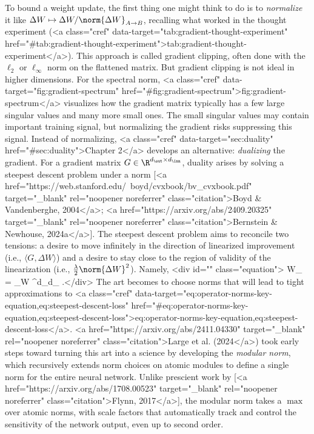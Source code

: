 To bound a weight update, the first thing one might think to do is to \textit{normalize} it like $\Delta W \mapsto \Delta W / \norm{\Delta W}_{A \to B}$, recalling what worked in the thought experiment (<a class="cref" data-target="tab:gradient-thought-experiment" href="#tab:gradient-thought-experiment">tab:gradient-thought-experiment</a>). This approach is called gradient clipping, often done with the $\ell_2$ or $\ell_\infty$ norm on the flattened matrix. But gradient clipping is not ideal in higher dimensions. For the spectral norm, <a class="cref" data-target="fig:gradient-spectrum" href="#fig:gradient-spectrum">fig:gradient-spectrum</a> visualizes how the gradient matrix typically has a few large singular values and many more small ones. The small singular values may contain important training signal, but normalizing the gradient risks suppressing this signal. Instead of normalizing, <a class="cref" data-target="sec:duality" href="#sec:duality">Chapter 2</a> develops an alternative: \textit{dualizing} the gradient. For a gradient matrix $G \in \R^{d_\out \times d_\inn}$, duality arises by solving a steepest descent problem under a norm [<a href="https://web.stanford.edu/~boyd/cvxbook/bv_cvxbook.pdf" target="_blank" rel="noopener noreferrer" class="citation">Boyd & Vandenberghe, 2004</a>; <a href="https://arxiv.org/abs/2409.20325" target="_blank" rel="noopener noreferrer" class="citation">Bernstein & Newhouse, 2024a</a>]. The steepest descent problem aims to reconcile two tensions: a desire to move infinitely in the direction of linearized improvement (i.e., $\langle G, \Delta W \rangle$) and a desire to stay close to the region of validity of the linearization (i.e., $\tfrac{\lambda}{2} \norm{\Delta W}^2$). Namely, <div id="" class="equation">    \label{eq:steepest-descent}
    \Delta W_ = \argmin_{\Delta W \in \R^{d_\out \times d_\inn}} .</div> The art becomes to choose norms that will lead to tight approximations to <a class="cref" data-target="eq:operator-norms-key-equation,eq:steepest-descent-loss" href="#eq:operator-norms-key-equation,eq:steepest-descent-loss">eq:operator-norms-key-equation,eq:steepest-descent-loss</a>. <a href="https://arxiv.org/abs/2411.04330" target="_blank" rel="noopener noreferrer" class="citation">Large et al. (2024</a>) took early steps toward turning this art into a science by developing the \textit{modular norm}, which recursively extends norm choices on atomic modules to define a single norm for the entire neural network. Unlike prescient work by [<a href="https://arxiv.org/abs/1708.00523" target="_blank" rel="noopener noreferrer" class="citation">Flynn, 2017</a>], the modular norm takes a $\max$ over atomic norms, with scale factors that automatically track and control the sensitivity of the network output, even up to second order.


